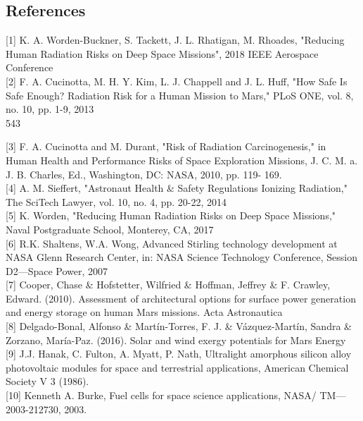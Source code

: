 \documentclass[12pt]{article}
\begin{document}
\newpage
\begin{center}
\section*{References}
\end{center}
\begin{small}
{[1]} K. A. Worden-Buckner, S. Tackett, J. L. Rhatigan, M. Rhoades, "Reducing Human Radiation Risks on Deep Space Missions", 2018 IEEE Aerospace Conference \\

{[2]} F. A. Cucinotta, M. H. Y. Kim, L. J. Chappell and J. L.
Huff, "How Safe Is Safe Enough? Radiation Risk for a
Human Mission to Mars," PLoS ONE, vol. 8, no. 10,
pp. 1-9, 2013 \\543

{[3]} F. A. Cucinotta and M. Durant, "Risk of Radiation
Carcinogenesis," in Human Health and Performance
Risks of Space Exploration Missions, J. C. M. a. J. B.
Charles, Ed., Washington, DC: NASA, 2010, pp. 119-
169. \\

{[4]} A. M. Sieffert, "Astronaut Health \& Safety Regulations
Ionizing Radiation," The SciTech Lawyer, vol. 10, no.
4, pp. 20-22, 2014 \\

{[5]} K. Worden, "Reducing Human Radiation Risks on
Deep Space Missions," Naval Postgraduate School,
Monterey, CA, 2017 \\

{[6]} R.K. Shaltens, W.A. Wong, Advanced Stirling technology development at NASA Glenn Research Center, in: NASA Science
Technology Conference, Session D2—Space Power, 2007
\\

{[7]} Cooper, Chase \& Hofstetter, Wilfried \& Hoffman, Jeffrey \& F. Crawley, Edward. (2010). Assessment of architectural options for surface power generation and energy storage on human Mars missions. Acta Astronautica \\

{[8]} Delgado-Bonal, Alfonso \& Martín-Torres, F. J. \& Vázquez-Martín, Sandra \& Zorzano, María-Paz. (2016). Solar and wind exergy potentials for Mars Energy
\\

{[9]} J.J. Hanak, C. Fulton, A. Myatt, P. Nath, Ultralight amorphous silicon
alloy photovoltaic modules for space and terrestrial applications,
American Chemical Society V 3 (1986).
\\

{[10]} Kenneth A. Burke, Fuel cells for space science applications, NASA/
TM—2003-212730, 2003.

\end{small}
\end{document}
